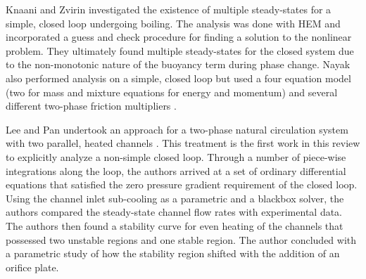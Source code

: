 Knaani and Zvirin investigated the existence of multiple steady-states for a simple, closed loop undergoing boiling\cite{knaani_bifurcation_1993}.
The analysis was done with HEM and incorporated a guess and check procedure for finding a solution to the nonlinear problem.
They ultimately found multiple steady-states for the closed system due to the non-monotonic nature of the buoyancy term during phase change.
Nayak \etal also performed analysis on a simple, closed loop but used a four equation model (two for mass and mixture equations for energy and momentum) and several different two-phase friction multipliers \cite{nayak_study_2007}.

Lee and Pan undertook an  approach for a two-phase natural circulation system with two parallel, heated channels \cite{lee_nonlinear_2005}.
This treatment is the first work in this review to explicitly analyze a non-simple closed loop.
Through a number of piece-wise integrations along the loop, the authors arrived at a set of ordinary differential equations that satisfied the zero pressure gradient requirement of the closed loop.
Using the channel inlet sub-cooling as a parametric and a blackbox solver, the authors compared the steady-state channel flow rates with experimental data.
The authors then found a stability curve for even heating of the channels that possessed two unstable regions and one stable region.
The author concluded with a parametric study of how the stability region shifted with the addition of an orifice plate.



